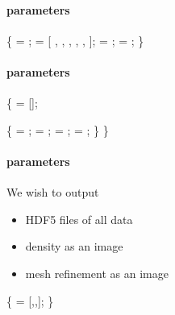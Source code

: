 
 \begin{frame}[fragile] 
 \secframetitle{\ssDoubleMach}
 \framesubtitle{ parameters}
\footnotesize
% 
% 
\begin{semiverbatim}
 \{
    = ;
    = [
      ,        
      ,
      ,
      ,
      ,
       ];
    = ; 
      = ;
\}
\end{semiverbatim}
\end{frame}


 \begin{frame}[fragile] 
 \secframetitle{\ssDoubleMach}
 \framesubtitle{ parameters}
\footnotesize
\begin{semiverbatim}
 \{
    = [];

    \{
         = ;
        = ;
        = ;
       = ;
  \}
\}
\end{semiverbatim}
\end{frame}


 \begin{frame}[fragile] 
 \secframetitle{\ssDoubleMach}
 \framesubtitle{ parameters}
We wish to output
\begin{itemize}
\item HDF5 files of all data
\item density as an image
\item mesh refinement as an image
\end{itemize}

\begin{semiverbatim}
 \{ 
    = [,,];
\}
\end{semiverbatim}
\end{frame}


